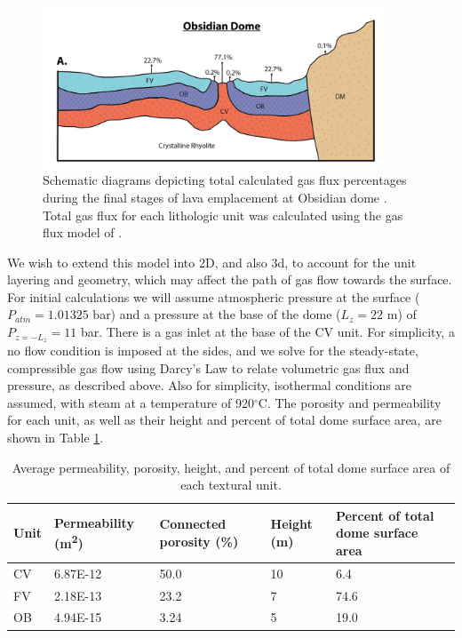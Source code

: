 \documentclass[11pt]{amsart}
\begin{document}
\begin{figure}
   \centering
\includegraphics[width=0.9\textwidth]{figs/crossSection.png}
\caption{Schematic diagrams depicting total calculated gas flux percentages during the final stages of lava emplacement at Obsidian dome \citep{Graham2023}.  Total gas flux for each lithologic unit was calculated using the gas flux model of \cite{Edmonds2003}.}
\label{fig:crossSection}
\end{figure}

We wish to extend this model into 2D, and also 3d, to account for the unit layering and geometry, which may affect the path of gas flow towards the surface.  For initial calculations we will assume atmospheric pressure at the surface ($P_{atm} = 1.01325$ bar) and a pressure at the base of the dome ($L_z=22$ m) of $P_{z=-L_z} = 11$ bar.  There is a gas inlet at the base of the CV unit.  For simplicity, a no flow condition is imposed at the sides, and we solve for the steady-state, compressible gas flow using Darcy's Law to relate volumetric gas flux and pressure, as described above.  Also for simplicity, isothermal conditions are assumed, with steam at a temperature of 920$^{\circ}$C.  The porosity and permeability for each unit, as well as their height and percent of total dome surface area, are shown in Table \ref{tab:UnitPermPoro}.

\begin{table}[h]
\center
      \small
      \begin{tabular}{lllll}
      \hline
      \textbf{Unit} & \textbf{Permeability (m\textsuperscript{2})} & \textbf{Connected porosity (\%)}  & \textbf{Height (m)} & \textbf{Percent of total dome surface area} \\  
      \hline
      CV & 6.87E-12 & 50.0 & 10 & 6.4 \\
      FV & 2.18E-13 & 23.2 &  7 & 74.6 \\
      OB & 4.94E-15 & 3.24 & 5 & 19.0 \\ 
\end{tabular}%
\caption{Average permeability, porosity, height, and percent of total dome surface area of each textural unit.} 
\label{tab:UnitPermPoro}
\end{table}
\end{document}
